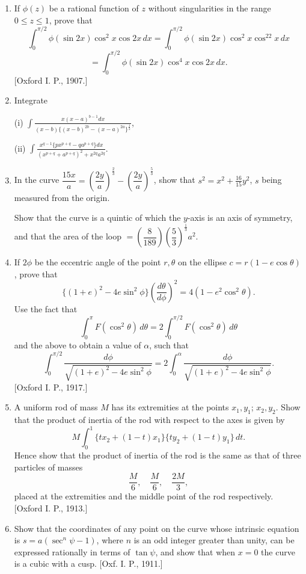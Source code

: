\documentclass[11pt, a4paper]{article}
\newcommand{\source}[1]{\hfill\textnormal{[#1]}}
\begin{document}
\begin{enumerate}[leftmargin=2em]
\item If $\phi(z)$ be a rational function of $z$ without singularities in the range $0\leq z\leq1$, prove that
\[
\int_0^{\pi/2}\phi(\sin2x)\cos^2x\cos2x\,dx=\int_0^{\pi/2}\phi(\sin2x)\cos^2x\cos^22x\,dx
\]
\[
=\int_0^{\pi/2}\phi(\sin2x)\cos^4x\cos2x\,dx.
\]
\source{Oxford I. P., 1907.}

\item Integrate

(i) $\displaystyle\int\frac{x(x-a)^{b-1}dx}{(x-b)\{(x-b)^{2b}-(x-a)^{2a}\}^{\frac12}}$,

(ii) $\displaystyle\int\frac{x^{q-1}\{px^{p+q}-qa^{p+q}\}dx}{(x^{p+q}+a^{p+q})^2+x^{2q}a^{2q}}$.

\item In the curve $\dfrac{15x}{a}=\left(\dfrac{2y}{a}\right)^{\frac23}-\left(\dfrac{2y}{a}\right)^{\frac53}$, show that $s^2=x^2+\tfrac{16}{15}y^2$, $s$ being measured from the origin.

Show that the curve is a quintic of which the $y$-axis is an axis of symmetry, and that the area of the loop $=\left(\dfrac{8}{189}\right)\left(\dfrac53\right)^{\frac13}a^2$.

\item If $2\phi$ be the eccentric angle of the point $r,\theta$ on the ellipse $c=r(1-e\cos\theta)$, prove that
\[
\{(1+e)^2-4e\sin^2\phi\}\left(\frac{d\theta}{d\phi}\right)^2=4(1-e^2\cos^2\theta).
\]
Use the fact that
\[
\int_0^\pi F(\cos^2\theta)\,d\theta=2\int_0^{\pi/2}F(\cos^2\theta)\,d\theta
\]
and the above to obtain a value of $\alpha$, such that
\[
\int_0^{\pi/2}\frac{d\phi}{\sqrt{(1+e)^2-4e\sin^2\phi}}=2\int_0^\alpha\frac{d\phi}{\sqrt{(1+e)^2-4e\sin^2\phi}}.
\]
\source{Oxford I. P., 1917.}

\item A uniform rod of mass $M$ has its extremities at the points $x_1,y_1$; $x_2,y_2$. Show that the product of inertia of the rod with respect to the axes is given by
\[
M\int_0^1\{tx_2+(1-t)x_1\}\{ty_2+(1-t)y_1\}\,dt.
\]
Hence show that the product of inertia of the rod is the same as that of three particles of masses
\[
\frac{M}{6},\quad\frac{M}{6},\quad\frac{2M}{3},
\]
placed at the extremities and the middle point of the rod respectively. \source{Oxford I. P., 1913.}

\item Show that the coordinates of any point on the curve whose intrinsic equation is $s=a(\sec^n\psi-1)$, where $n$ is an odd integer greater than unity, can be expressed rationally in terms of $\tan\psi$, and show that when $x=0$ the curve is a cubic with a cusp. \source{Oxf. I. P., 1911.}


\end{enumerate}
\end{document}
